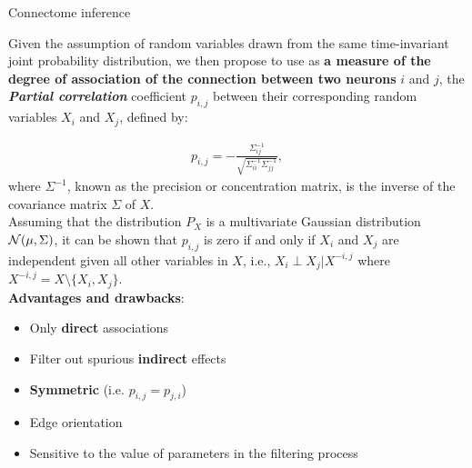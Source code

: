 \documentclass[final]{beamer}
\newcommand{\cmark}{\ding{51}}%
\newcommand{\xmark}{\ding{55}}%
\begin{document}
\begin{frame}{}
\begin{textblock}{0.485}
\begin{block}{Connectome inference \phantom{p}}
\vspace{1.5cm}

Given the assumption of random variables drawn from the same time-invariant joint probability distribution, we then propose to use as \textbf{a measure of the
degree of association of the connection between two neurons} $i$ and $j$, the  \textbf{
\textit{Partial correlation}} coefficient $p_{i,j}$ between their corresponding
random variables $X_i$ and $X_j$, defined by:

\begin{align*}
p_{i,j} =
-\frac{\Sigma^{-1}_{ij}}{\sqrt{\Sigma^{-1}_{ii} \Sigma^{-1}_{jj}}}, \label{eq:inverse}
\end{align*}
where $\Sigma^{-1}$, known as the precision or concentration matrix, is the inverse of the covariance matrix $\Sigma$ of $X$.\\[2ex]

Assuming that the distribution $P_X$ is a multivariate Gaussian
distribution ${\cal N}(\mu,\Sigma)$, it can be shown that $p_{i,j}$ is
zero if and only if $X_i$ and $X_j$ are independent given all other
variables in $X$, i.e., $X_i \perp X_j|X^{-i,j}$ where $X^{-i,j}= X
\setminus\{X_i,X_j\}$.\\[3ex]

\textbf{Advantages and drawbacks}:\\[2ex]

\begin{minipage}{0.8\linewidth}
\begin{itemize}
\item[\vspace{1cm}{\color{green} \cmark}] Only \textbf{direct} associations
\item[\vspace{1cm}{\color{green} \cmark}] Filter out spurious \textbf{indirect} effects
\item[\vspace{1cm}{\color{green} \cmark}] \textbf{Symmetric} (i.e. $p_{i,j}=p_{j,i}$)\\[3ex]
\item[\vspace{1cm}{\color{red} \xmark}] Edge orientation
\item[\vspace{1cm}{\color{red} \xmark}] Sensitive to the value of parameters in the filtering process
\end{itemize}
\end{minipage}

\end{block}


\end{textblock}
\end{frame}
\end{document}
